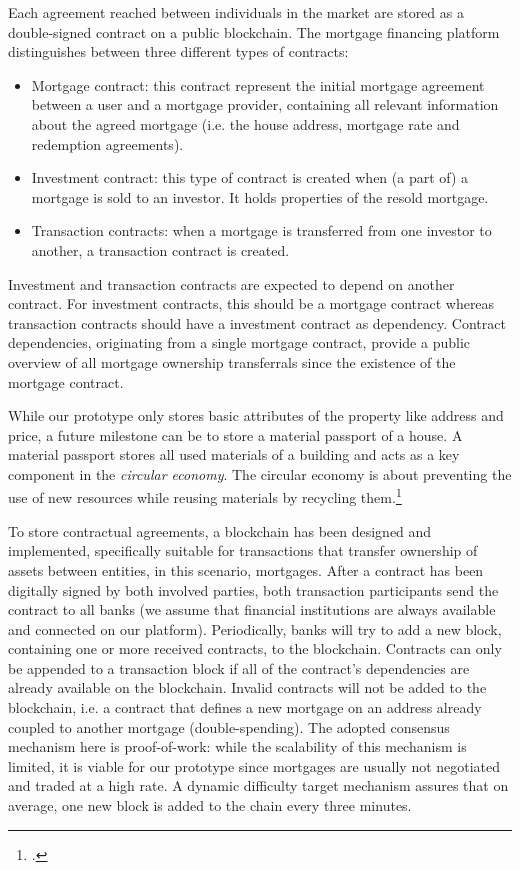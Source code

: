 \documentclass[USenglish]{article}
\begin{document}
Each agreement reached between individuals in the market are stored as a double-signed contract on a public blockchain.
The mortgage financing platform distinguishes between three different types of contracts:
\begin{itemize}
	\item Mortgage contract: this contract represent the initial mortgage agreement between a user and a mortgage provider, containing all relevant information about the agreed mortgage (i.e. the house address, mortgage rate and redemption agreements).
	\item Investment contract: this type of contract is created when (a part of) a mortgage is sold to an investor. It holds properties of the resold mortgage.
	\item Transaction contracts: when a mortgage is transferred from one investor to another, a transaction contract is created.
\end{itemize}
Investment and transaction contracts are expected to depend on another contract.
For investment contracts, this should be a mortgage contract whereas transaction contracts should have a investment contract as dependency.
Contract dependencies, originating from a single mortgage contract, provide a public overview of all mortgage ownership transferrals since the existence of the mortgage contract.

While our prototype only stores basic attributes of the property like address and price, a future milestone can be to store a material passport of a house.
A material passport stores all used materials of a building and acts as a key component in the \emph{circular economy}.
The circular economy is about preventing the use of new resources while reusing materials by recycling them.\footcite{madasterpassport}

To store contractual agreements, a blockchain has been designed and implemented, specifically suitable for transactions that transfer ownership of assets between entities, in this scenario, mortgages.
After a contract has been digitally signed by both involved parties, both transaction participants send the contract to all banks (we assume that financial institutions are always available and connected on our platform).
Periodically, banks will try to add a new block, containing one or more received contracts, to the blockchain.
Contracts can only be appended to a transaction block if all of the contract's dependencies are already available on the blockchain.
Invalid contracts will not be added to the blockchain, i.e. a contract that defines a new mortgage on an address already coupled to another mortgage (double-spending).
The adopted consensus mechanism here is proof-of-work: while the scalability of this mechanism is limited, it is viable for our prototype since mortgages are usually not negotiated and traded at a high rate.
A dynamic difficulty target mechanism assures that on average, one new block is added to the chain every three minutes.
\end{document}
